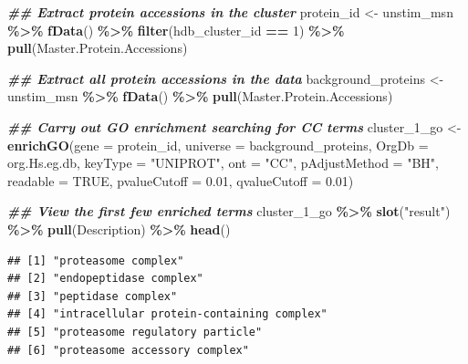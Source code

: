 \documentclass[9pt,a4paper,]{extarticle}
\newenvironment{Shaded}{\begin{snugshade}}{\end{snugshade}}
\newcommand{\AttributeTok}[1]{\textcolor[rgb]{0.13,0.29,0.53}{#1}}
\newcommand{\ConstantTok}[1]{\textcolor[rgb]{0.56,0.35,0.01}{#1}}
\newcommand{\DecValTok}[1]{\textcolor[rgb]{0.00,0.00,0.81}{#1}}
\newcommand{\DocumentationTok}[1]{\textcolor[rgb]{0.56,0.35,0.01}{\textbf{\textit{#1}}}}
\newcommand{\FloatTok}[1]{\textcolor[rgb]{0.00,0.00,0.81}{#1}}
\newcommand{\FunctionTok}[1]{\textcolor[rgb]{0.13,0.29,0.53}{\textbf{#1}}}
\newcommand{\NormalTok}[1]{#1}
\newcommand{\OtherTok}[1]{\textcolor[rgb]{0.56,0.35,0.01}{#1}}
\newcommand{\SpecialCharTok}[1]{\textcolor[rgb]{0.81,0.36,0.00}{\textbf{#1}}}
\newcommand{\StringTok}[1]{\textcolor[rgb]{0.31,0.60,0.02}{#1}}
\begin{document}
\begin{Shaded}
\begin{Highlighting}[]
\DocumentationTok{\#\# Extract protein accessions in the cluster}
\NormalTok{protein\_id }\OtherTok{\textless{}{-}}\NormalTok{ unstim\_msn }\SpecialCharTok{\%\textgreater{}\%}
  \FunctionTok{fData}\NormalTok{() }\SpecialCharTok{\%\textgreater{}\%}
  \FunctionTok{filter}\NormalTok{(hdb\_cluster\_id }\SpecialCharTok{==} \DecValTok{1}\NormalTok{) }\SpecialCharTok{\%\textgreater{}\%}
  \FunctionTok{pull}\NormalTok{(Master.Protein.Accessions)}

\DocumentationTok{\#\# Extract all protein accessions in the data}
\NormalTok{background\_proteins }\OtherTok{\textless{}{-}}\NormalTok{ unstim\_msn }\SpecialCharTok{\%\textgreater{}\%}
  \FunctionTok{fData}\NormalTok{() }\SpecialCharTok{\%\textgreater{}\%}
  \FunctionTok{pull}\NormalTok{(Master.Protein.Accessions)}

\DocumentationTok{\#\# Carry out GO enrichment searching for CC terms}
\NormalTok{cluster\_1\_go }\OtherTok{\textless{}{-}} \FunctionTok{enrichGO}\NormalTok{(}\AttributeTok{gene =}\NormalTok{ protein\_id,}
                         \AttributeTok{universe =}\NormalTok{ background\_proteins,}
                         \AttributeTok{OrgDb =}\NormalTok{ org.Hs.eg.db,}
                         \AttributeTok{keyType =} \StringTok{"UNIPROT"}\NormalTok{,}
                         \AttributeTok{ont =} \StringTok{"CC"}\NormalTok{,}
                         \AttributeTok{pAdjustMethod =} \StringTok{"BH"}\NormalTok{,}
                         \AttributeTok{readable =} \ConstantTok{TRUE}\NormalTok{,}
                         \AttributeTok{pvalueCutoff =} \FloatTok{0.01}\NormalTok{,}
                         \AttributeTok{qvalueCutoff =} \FloatTok{0.01}\NormalTok{)}
\end{Highlighting}
\end{Shaded}

\begin{Shaded}
\begin{Highlighting}[]
\DocumentationTok{\#\# View the first few enriched terms}
\NormalTok{cluster\_1\_go }\SpecialCharTok{\%\textgreater{}\%} 
  \FunctionTok{slot}\NormalTok{(}\StringTok{"result"}\NormalTok{) }\SpecialCharTok{\%\textgreater{}\%} 
  \FunctionTok{pull}\NormalTok{(Description) }\SpecialCharTok{\%\textgreater{}\%} 
  \FunctionTok{head}\NormalTok{()}
\end{Highlighting}
\end{Shaded}

\begin{verbatim}
## [1] "proteasome complex"                      
## [2] "endopeptidase complex"                   
## [3] "peptidase complex"                       
## [4] "intracellular protein-containing complex"
## [5] "proteasome regulatory particle"          
## [6] "proteasome accessory complex"
\end{verbatim}
\end{document}

